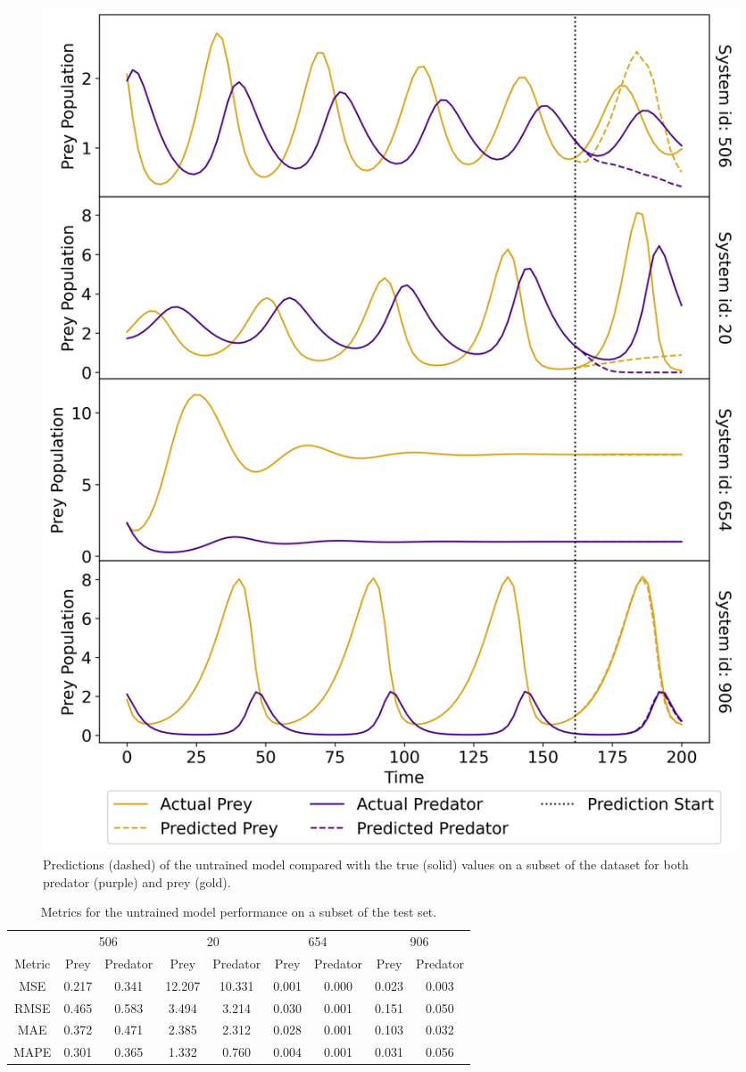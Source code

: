 \documentclass[11pt,a4paper]{article}
\begin{document}
\begin{figure}[h]
    \centering
    \includegraphics[width=\columnwidth, keepaspectratio]{../plots/predictions_example.png}
    \caption{Predictions (dashed) of the untrained model compared with the true (solid) values on a subset of the dataset for both predator (purple) and prey (gold).}
    \label{fig:baseline_pred}
\end{figure}

\begin{table}[h]
    \centering
    \begin{tabular}{c|c|c|c|c|c|c|c|c}
        & \multicolumn{2}{c|}{506} & \multicolumn{2}{c|}{20} & \multicolumn{2}{c|}{654} & \multicolumn{2}{|c}{906} \\
        Metric & Prey & Predator & Prey & Predator & Prey & Predator & Prey & Predator \\
        \hline
        MSE & 0.217 & 0.341 & 12.207 & 10.331 & 0.001 & 0.000 & 0.023 & 0.003 \\
        RMSE & 0.465 & 0.583 & 3.494 & 3.214 & 0.030 & 0.001 & 0.151 & 0.050 \\
        MAE & 0.372 & 0.471 & 2.385 & 2.312 & 0.028 & 0.001 & 0.103 & 0.032 \\
        MAPE & 0.301 & 0.365 & 1.332 & 0.760 & 0.004 & 0.001 & 0.031 & 0.056 \\
    \end{tabular}
    \caption{Metrics for the untrained model performance on a subset of the test set.}
    \label{tab:baseline}
\end{table}
\end{document}
